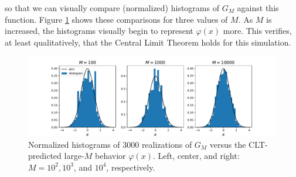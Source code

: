 \documentclass[11pt]{amsart}
\begin{document}
so that we can visually compare (normalized) histograms of $G_M$ against this function. Figure \ref{fig:CLT} shows these comparisons for three values of $M$. As $M$ is increased, the histograms visually begin to represent $\varphi(x)$ more. This verifies, at least qualitatively, that the Central Limit Theorem holds for this simulation.
\begin{figure}
  \begin{center}
    \includegraphics[width=\textwidth]{CLT.pdf}
  \end{center}
  \caption{Normalized histograms of 3000 realizations of $G_M$ versus the CLT-predicted large-$M$ behavior $\varphi(x)$. Left, center, and right: $M = 10^2, 10^3$, and $10^4$, respectively.}\label{fig:CLT}
\end{figure}
\end{document}

